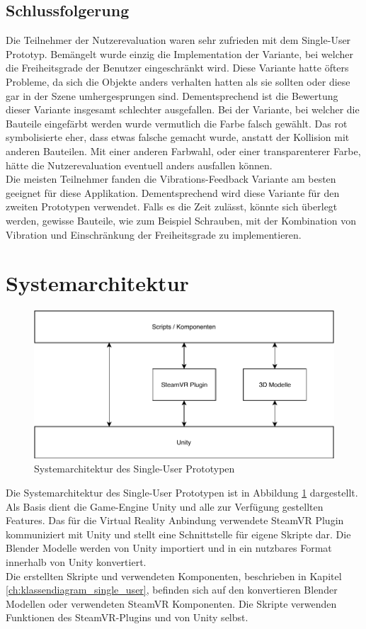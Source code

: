 \pagebreak
\subsection{Schlussfolgerung}
\label{ch:schlussfolgerung_t1}
Die Teilnehmer der Nutzerevaluation waren sehr zufrieden mit dem Single-User Prototyp. Bemängelt wurde einzig die Implementation der Variante, bei welcher die Freiheitsgrade der Benutzer eingeschränkt wird. Diese Variante hatte öfters Probleme, da sich die Objekte anders verhalten hatten als sie sollten oder diese gar in der Szene umhergesprungen sind. Dementsprechend ist die Bewertung dieser Variante insgesamt schlechter ausgefallen. Bei der Variante, bei welcher die Bauteile eingefärbt werden wurde vermutlich die Farbe falsch gewählt. Das rot symbolisierte eher, dass etwas falsche gemacht wurde, anstatt der Kollision mit anderen Bauteilen. Mit einer anderen Farbwahl, oder einer transparenterer Farbe, hätte die Nutzerevaluation eventuell anders ausfallen können. \\

\noindent Die meisten Teilnehmer fanden die Vibrations-Feedback Variante am besten geeignet für diese Applikation. Dementsprechend wird diese Variante für den zweiten Prototypen verwendet. Falls es die Zeit zulässt, könnte sich überlegt werden, gewisse Bauteile, wie zum Beispiel Schrauben, mit der Kombination von Vibration und Einschränkung der Freiheitsgrade zu implementieren.

\section{Systemarchitektur}
\label{ch:systemarchitektur_single_user}
\begin{figure}[h!]
	\centering
	\includegraphics[keepaspectratio,width=0.65\linewidth]{img/ArchitekturT1.pdf}
	\caption{Systemarchitektur des Single-User Prototypen}
	\label{fig:systemarchitektur_single_user}
\end{figure}

Die Systemarchitektur des Single-User Prototypen ist in Abbildung \ref{fig:systemarchitektur_single_user} dargestellt. Als Basis dient die Game-Engine Unity und alle zur Verfügung gestellten Features. Das für die Virtual Reality Anbindung verwendete SteamVR Plugin kommuniziert mit Unity und stellt eine Schnittstelle für eigene Skripte dar. Die Blender Modelle werden von Unity importiert und in ein nutzbares Format innerhalb von Unity konvertiert. \\
Die erstellten Skripte und verwendeten Komponenten, beschrieben in Kapitel \ref{ch:klassendiagram_single_user}, befinden sich auf den konvertieren Blender Modellen oder verwendeten SteamVR Komponenten. Die Skripte verwenden Funktionen des SteamVR-Plugins und von Unity selbst.


